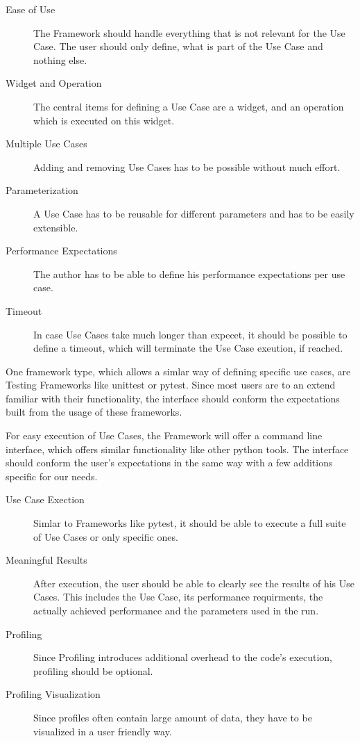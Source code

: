 \begin{description}
    \item[Ease of Use] 
        The Framework should handle everything that is not relevant for the Use
        Case. The user should only define, what is part of the Use Case and
        nothing else.
    \item[Widget and Operation]
        The central items for defining a Use Case are a widget, and an operation
        which is executed on this widget.
    \item[Multiple Use Cases]
        Adding and removing Use Cases has to be possible without much effort.
    \item[Parameterization]
        A Use Case has to be reusable for different parameters and has to be
        easily extensible.
    \item[Performance Expectations]
        The author has to be able to define his performance expectations per use
        case.
    \item[Timeout]
        In case Use Cases take much longer than expecet, it should be possible
        to define a timeout, which will terminate the Use Case exeution, if
        reached.
\end{description}

One framework type, which allows a simlar way of defining specific use cases,
are Testing Frameworks like unittest or pytest. Since most users are to an
extend familiar with their functionality, the interface should conform the
expectations built from the usage of these frameworks.

For easy execution of Use Cases, the Framework will offer a command line
interface, which offers similar functionality like other python tools. The
interface should conform the user's expectations in the same way with a few
additions specific for our needs. 

\begin{description}
    \item[Use Case Exection]
        Simlar to Frameworks like pytest, it should be able to execute a full
        suite of Use Cases or only specific ones.
    \item[Meaningful Results]
        After execution, the user should be able to clearly see the results of
        his Use Cases. This includes the Use Case, its performance requirments,
        the actually achieved performance and the parameters used in the run.
    \item[Profiling]
        Since Profiling introduces additional overhead to the code's execution,
        profiling should be optional.
    \item[Profiling Visualization]
        Since profiles often contain large amount of data, they have to be
        visualized in a user friendly way.
\end{description}

